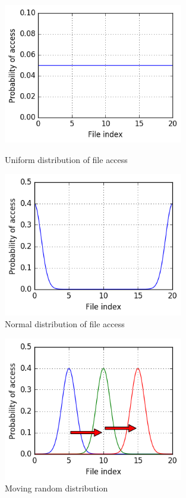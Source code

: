 \documentclass[
  color, %
  table, %
  lof,   %
  lot,   %
]{fithesis3}
\begin{document}
\begin{figure}[!htb]
    \centering
    \begin{minipage}{\textwidth}
        \centering
        \includegraphics[width=0.7\textwidth]{../scripts/fig1.png}
        \caption{Uniform distribution of file access}
\label{fig:rand1}
    \end{minipage}\hfill
    \begin{minipage}{\textwidth}
        \centering
        \includegraphics[width=0.7\textwidth]{../scripts/fig2.png}
        \caption{Normal distribution of file access}

\label{fig:rand2}
    \end{minipage}

\end{figure}
\begin{figure}
    \begin{minipage}{\textwidth}
        \centering
        \includegraphics[width=0.7\textwidth]{../scripts/fig3.png}
        \caption{Moving random distribution}
\label{fig:rand3}
    \end{minipage}
\end{figure}
\end{document}

